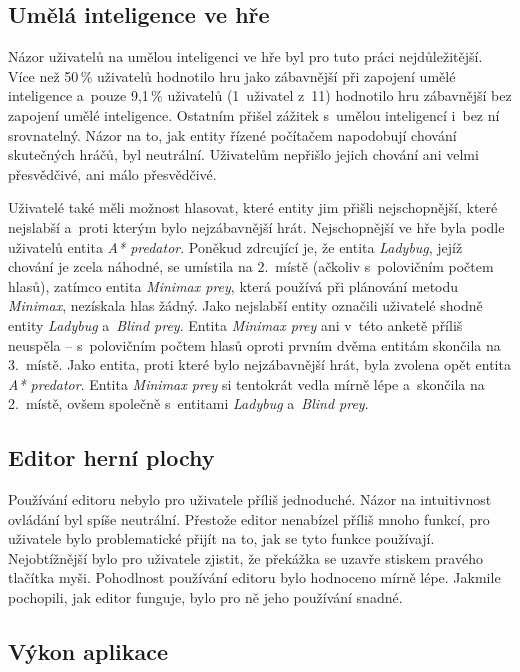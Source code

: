 \subsection*{Umělá inteligence ve hře}

Názor uživatelů na umělou inteligenci ve hře byl pro tuto práci nejdůležitější. Více než 50\,\% uživatelů hodnotilo hru jako zábavnější při zapojení umělé inteligence a~pouze 9,1\,\% uživatelů (1~uživatel z~11) hodnotilo hru zábavnější bez zapojení umělé inteligence. Ostatním přišel zážitek s~umělou inteligencí i~bez ní srovnatelný. Názor na to, jak entity řízené počítačem napodobují chování skutečných hráčů, byl neutrální. Uživatelům nepřišlo jejich chování ani velmi přesvědčivé, ani málo přesvědčivé.

Uživatelé také měli možnost hlasovat, které entity jim přišli nejschopnější, které nejslabší a~proti kterým bylo nejzábavnější hrát. Nejschopnější ve hře byla podle uživatelů entita \emph{A* predator}. Poněkud zdrcující je, že entita \emph{Ladybug}, jejíž chování je zcela náhodné, se umístila na 2.~místě (ačkoliv s~polovičním počtem hlasů), zatímco entita \emph{Minimax prey}, která používá při plánování metodu \emph{Minimax}, nezískala hlas žádný. Jako nejslabší entity označili uživatelé shodně entity \emph{Ladybug} a~\emph{Blind prey}. Entita \emph{Minimax prey} ani v~této anketě příliš neuspěla -- s~polovičním počtem hlasů oproti prvním dvěma entitám skončila na 3.~místě. Jako entita, proti které bylo nejzábavnější hrát, byla zvolena opět entita \emph{A* predator}. Entita \emph{Minimax prey} si tentokrát vedla mírně lépe a~skončila na 2.~místě, ovšem společně s~entitami \emph{Ladybug} a~\emph{Blind prey}.

\subsection*{Editor herní plochy}

Používání editoru nebylo pro uživatele příliš jednoduché. Názor na intuitivnost ovládání byl spíše neutrální. Přestože editor nenabízel příliš mnoho funkcí, pro uživatele bylo problematické přijít na to, jak se tyto funkce používají. Nejobtížnější bylo pro uživatele zjistit, že překážka se uzavře stiskem pravého tlačítka myši. Pohodlnost používání editoru bylo hodnoceno mírně lépe. Jakmile pochopili, jak editor funguje, bylo pro ně jeho používání snadné.

\subsection*{Výkon aplikace}

